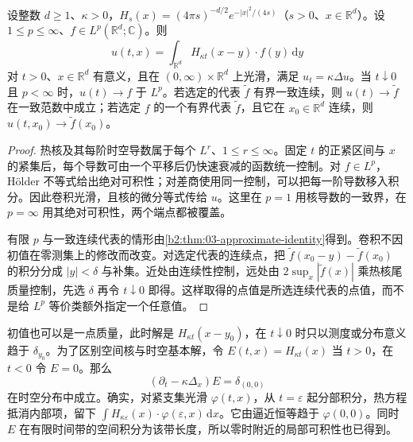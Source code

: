 \begin{theorem}[全空间热核解]\label{b2:thm:12-heat-convolution}
设整数 \(d\geq1\)、\(\kappa>0\)，\(H_s(x)=(4\pi s)^{-d/2}e^{-|x|^2/(4s)}\)（\(s>0\)、\(x\in\mathbb R^d\)）。设 \(1\leq p\leq\infty\)、\(f\in L^p(\mathbb R^d;\mathbb C)\)。则
\begin{equation}\label{b2:eq:12-heat-convolution}
 u(t,x)=\int_{\mathbb R^d}H_{\kappa t}(x-y)\cdot f(y)\,\mathrm{d}y
\end{equation}
对 \(t>0\)、\(x\in\mathbb R^d\) 有意义，且在 \((0,\infty)\times\mathbb R^d\) 上光滑，满足 \(u_t=\kappa\Delta u\)。当 \(t\downarrow0\) 且 \(p<\infty\) 时，\(u(t)\to f\) 于 \(L^p\)。若选定的代表 \(\widetilde f\) 有界一致连续，则 \(u(t)\to\widetilde f\) 在一致范数中成立；若选定 \(f\) 的一个有界代表 \(\widetilde f\)，且它在 \(x_0\in\mathbb R^d\) 连续，则 \(u(t,x_0)\to\widetilde f(x_0)\)。
\end{theorem}
\begin{proof}
热核及其每阶时空导数属于每个 \(L^r\)、\(1\leq r\leq\infty\)。固定 \(t\) 的正紧区间与 \(x\) 的紧集后，每个导数可由一个平移后仍快速衰减的函数统一控制。对 \(f\in L^p\)，Hölder 不等式给出绝对可积性；对差商使用同一控制，可以把每一阶导数移入积分。因此卷积光滑，且核的微分等式传给 \(u\)。这里在 \(p=1\) 用核导数的一致界，在 \(p=\infty\) 用其绝对可积性，两个端点都被覆盖。

有限 \(p\) 与一致连续代表的情形由\cref{b2:thm:03-approximate-identity}得到。卷积不因初值在零测集上的修改而改变。对选定代表的连续点，把 \(\widetilde f(x_0-y)-\widetilde f(x_0)\) 的积分分成 \(|y|<\delta\) 与补集。近处由连续性控制，远处由 \(2\sup_x|\widetilde f(x)|\) 乘热核尾质量控制，先选 \(\delta\) 再令 \(t\downarrow0\) 即得。这样取得的点值是所选连续代表的点值，而不是给 \(L^p\) 等价类额外指定一个任意值。
\end{proof}

初值也可以是一点质量，此时解是 \(H_{\kappa t}(x-y_0)\)，在 \(t\downarrow0\) 时只以测度或分布意义趋于 \(\delta_{y_0}\)。为了区别空间核与时空基本解，令 \(E(t,x)=H_{\kappa t}(x)\) 当 \(t>0\)，在 \(t<0\) 令 \(E=0\)。那么
\[
 (\partial_t-\kappa\Delta_x)E=\delta_{(0,0)}
\]
在时空分布中成立。确实，对紧支集光滑 \(\varphi(t,x)\)，从 \(t=\varepsilon\) 起分部积分，热方程抵消内部项，留下 \(\int H_{\kappa\varepsilon}(x)\cdot\varphi(\varepsilon,x)\,\mathrm{d}x\)。它由逼近恒等趋于 \(\varphi(0,0)\)。同时 \(E\) 在有限时间带的空间积分为该带长度，所以零时附近的局部可积性也已得到。

\ProseParagraphBreak

